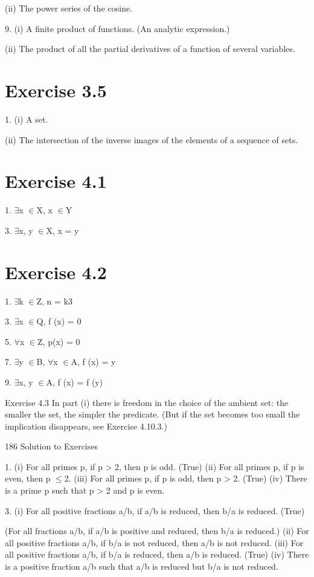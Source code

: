 \documentclass[11pt]{article}
\theoremstyle{plain}
\theoremstyle{definition}
\begin{document}
(ii) The power series of the cosine.

9. (i) A finite product of functions. (An analytic expression.)

(ii) The product of all the partial derivatives of a function of several variables.

\section{Exercise 3.5}

1. (i) A set.

(ii) The intersection of the inverse images of the elements of a sequence of sets.

\section{Exercise 4.1}

1. $\exists$x $\in$X, x $\in$Y

3. $\exists$x, y $\in$X, x = y

\section{Exercise 4.2}

1. $\exists$k $\in$Z, n = k3

3. $\exists$x $\in$Q, f (x) = 0

5. $\forall$x $\in$Z, p(x) = 0

7. $\exists$y $\in$B, $\forall$x $\in$A, f (x) = y

9. $\exists$x, y $\in$A, f (x) = f (y)

Exercise 4.3 In part (i) there is freedom in the choice of the ambient set: the smaller the set, the simpler the predicate. (But if the set becomes too small the implication disappears, see Exercise 4.10.3.)

186 Solution to Exercises

1. (i) For all primes p, if p > 2, then p is odd. (True) (ii) For all primes p, if p is even, then p $\leq$2. (iii) For all primes p, if p is odd, then p > 2. (True) (iv) There is a prime p such that p > 2 and p is even.

3. (i) For all positive fractions a/b, if a/b is reduced, then b/a is reduced. (True)

(For all fractions a/b, if a/b is positive and reduced, then b/a is reduced.) (ii) For all positive fractions a/b, if b/a is not reduced, then a/b is not reduced. (iii) For all positive fractions a/b, if b/a is reduced, then a/b is reduced. (True) (iv) There is a positive fraction a/b such that a/b is reduced but b/a is not reduced.
\end{document}
